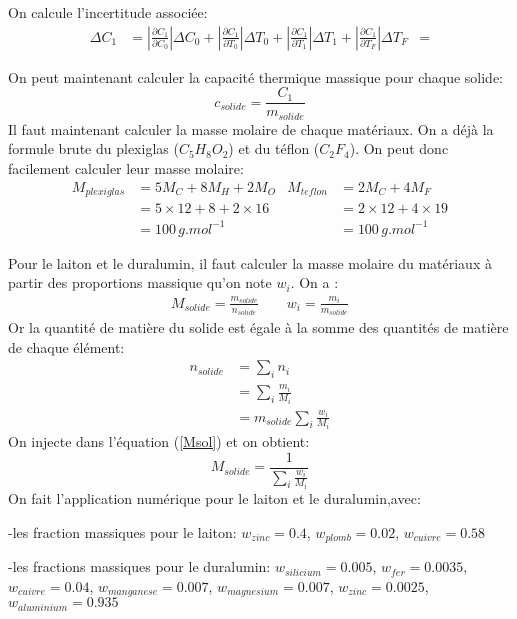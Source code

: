 \documentclass[12pt]{article}
\begin{document}
On calcule l'incertitude associée:
\begin{align*}
\Delta C_1 &= \displaystyle\left\lvert \frac{\partial C_1}{\partial C_0}\right\rvert \Delta C_0 + \displaystyle\left\lvert \frac{\partial C_1}{\partial T_0}\right\rvert \Delta T_0 + \displaystyle\left\lvert \frac{\partial C_1}{\partial T_1}\right\rvert \Delta T_1 + \displaystyle\left\lvert \frac{\partial C_1}{\partial T_F}\right\rvert \Delta T_F
&= 
\end{align*}




On peut maintenant calculer la capacité thermique massique pour chaque solide:
\begin{equation}
c_{solide}=\frac{C_1}{m_{solide}}
\end{equation}
Il faut maintenant calculer la masse molaire de chaque matériaux. On a déjà la formule brute du plexiglas ($C_5H_8O_2$) et du téflon ($C_2F_4$). On peut donc facilement calculer leur masse molaire:
\begin{align*}
M_{plexiglas}&=5M_C+8M_H+2M_O & M_{teflon}&=2M_C+4M_F  \\
&=5\times 12+8+2\times 16 & &=2\times 12+4\times 19 \\
&=100\, g.mol^{-1} & &=100\, g.mol^{-1}
\end{align*}

Pour le laiton et le duralumin, il faut calculer la masse molaire du matériaux à partir des proportions massique qu'on note $w_{i}$. On a :
\begin{gather}
M_{solide}=\frac{m_{solide}}{n_{solide}} \quad \quad w_{i}= \frac{m_i}{m_{solide}}
\label{Msol}
\end{gather}
Or la quantité de matière du solide est égale à la somme des quantités de matière de chaque élément:
\begin{align*}
n_{solide}&=\sum_{i}n_i \\
&=\sum_{i}\frac{m_i}{M_i} \\
&=m_{solide}\sum_{i}\frac{w_i}{M_i}
\end{align*}
On injecte dans l'équation (\ref{Msol}) et on obtient:
\begin{equation}
M_{solide}=\frac{1}{\sum_{i}\frac{w_i}{M_i}}
\end{equation}
On fait l'application numérique pour le laiton et le duralumin,avec:

	-les fraction massiques pour le laiton: $w_{zinc}=0.4$, $w_{plomb}=0.02$, $w_{cuivre}=0.58$
	
	-les fractions massiques pour le duralumin: $w_{silicium}=0.005$, $w_{fer}=0.0035$, $w_{cuivre}=0.04$, $w_{manganese}=0.007$, $w_{magnesium}=0.007$, $w_{zinc}=0.0025$, $w_{aluminium}=0.935$
	
\end{document}
